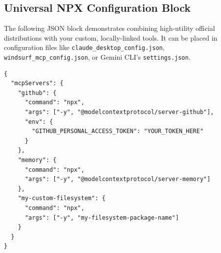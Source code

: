 \subsection{Universal NPX Configuration Block}
The following JSON block demonstrates combining high-utility official distributions with your custom, locally-linked tools. It can be placed in configuration files like \lstinline[style=inline]|claude_desktop_config.json|, \lstinline[style=inline]|windsurf_mcp_config.json|, or Gemini CLI's \lstinline[style=inline]|settings.json|.

\begin{lstlisting}[style=json]
{
  "mcpServers": {
    "github": {
      "command": "npx",
      "args": ["-y", "@modelcontextprotocol/server-github"],
      "env": {
        "GITHUB_PERSONAL_ACCESS_TOKEN": "YOUR_TOKEN_HERE"
      }
    },
    "memory": {
      "command": "npx",
      "args": ["-y", "@modelcontextprotocol/server-memory"]
    },
    "my-custom-filesystem": {
      "command": "npx",
      "args": ["-y", "my-filesystem-package-name"]
    }
  }
}
\end{lstlisting}
